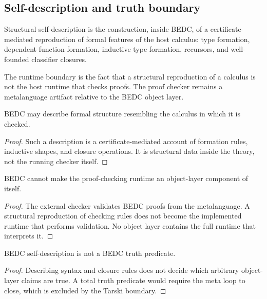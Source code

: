 \subsection{Self-description and truth boundary}
\label{subsec:philosophy-self-description-truth-boundary}

\begin{definition}
\label{def:philosophy-structural-self-description}
Structural self-description is the construction, inside BEDC, of a
certificate-mediated reproduction of formal features of the host
calculus: type formation, dependent function formation, inductive type
formation, recursors, and well-founded classifier closures.
\end{definition}

\begin{definition}
\label{def:philosophy-runtime-boundary}
The runtime boundary is the fact that a structural reproduction of a
calculus is not the host runtime that checks proofs. The proof checker
remains a metalanguage artifact relative to the BEDC object layer.
\end{definition}

\begin{theorem}
\label{thm:philosophy-bedc-describes-formal-structure}
BEDC may describe formal structure resembling the calculus in which it
is checked.
\end{theorem}
\begin{proof}
Such a description is a certificate-mediated account of formation
rules, inductive shapes, and closure operations. It is structural data
inside the theory, not the running checker itself.
\end{proof}

\begin{theorem}
\label{thm:philosophy-bedc-does-not-internalize-runtime}
BEDC cannot make the proof-checking runtime an object-layer component
of itself.
\end{theorem}
\begin{proof}
The external checker validates BEDC proofs from the metalanguage. A
structural reproduction of checking rules does not become the
implemented runtime that performs validation. No object layer contains
the full runtime that interprets it.
\end{proof}

\begin{theorem}
\label{thm:philosophy-self-description-not-truth-definition}
BEDC self-description is not a BEDC truth predicate.
\end{theorem}
\begin{proof}
Describing syntax and closure rules does not decide which arbitrary
object-layer claims are true. A total truth predicate would require the
meta loop to close, which is excluded by the Tarski boundary.
\end{proof}

